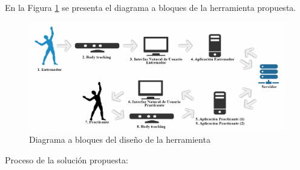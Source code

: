 En la Figura \ref{fig:Bloques}  se presenta el diagrama a bloques de la herramienta propuesta.

\begin{figure}[H]%
	\begin{center}
		\includegraphics[scale=0.35]{./Figuras/DiagramaBloques}
	\end{center}
	\caption{Diagrama a bloques del diseño de la herramienta}
	\label{fig:Bloques}
\end{figure}

Proceso de la solución propuesta:

